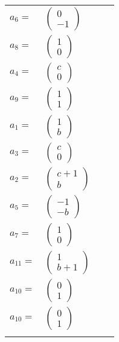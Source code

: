 \documentclass[1p]{elsarticle_modified}
\theoremstyle{definition}
\begin{document}
\begin{tabular}{m{7pt} m{180pt} m{7pt} m{180pt} }
\flushright $a_{6}=$&$\begin{pmatrix}0\\-1\end{pmatrix}$ \\
\flushright $a_{8}=$&$\begin{pmatrix}1\\0\end{pmatrix}$ \\
\flushright $a_{4}=$&$\begin{pmatrix}c\\0\end{pmatrix}$ \\
\flushright $a_{9}=$&$\begin{pmatrix}1\\1\end{pmatrix}$ \\
\flushright $a_{1}=$&$\begin{pmatrix}1\\b\end{pmatrix}$ \\
\flushright $a_{3}=$&$\begin{pmatrix}c\\0\end{pmatrix}$ \\
\flushright $a_{2}=$&$\begin{pmatrix}c+1\\b\end{pmatrix}$ \\
\flushright $a_{5}=$&$\begin{pmatrix}-1\\- b\end{pmatrix}$ \\
\flushright $a_{7}=$&$\begin{pmatrix}1\\0\end{pmatrix}$ \\
\flushright $a_{11}=$&$\begin{pmatrix}1\\b+1\end{pmatrix}$ \\
\flushright $a_{10}=$&$\begin{pmatrix}0\\1\end{pmatrix}$\\ \flushright $a_{10}=$&$\begin{pmatrix}0\\1\end{pmatrix}$\\&\end{tabular}
\end{document}
